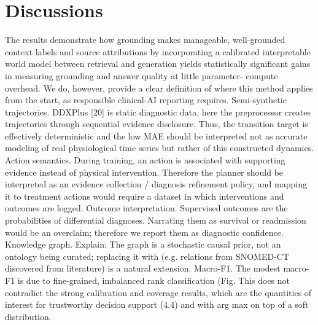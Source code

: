 \section{Discussions}
The results demonstrate how grounding makes manageable, well-grounded context labels and source attributions by incorporating a calibrated interpretable world model between retrieval and generation yields statistically significant gains in measuring grounding and answer quality at little parameter- compute overhead. We do, however, provide a clear definition of where this method applies from the start, as responsible clinical-AI reporting requires.
Semi-synthetic trajectories. DDXPlus [20] is static diagnostic data, here the preprocessor creates trajectories through sequential evidence disclosure. Thus, the transition target is effectively deterministic and the low MAE should be interpreted not as accurate modeling of real physiological time series but rather of this constructed dynamics.
Action semantics. During training, an action is associated with supporting evidence instead of physical intervention. Therefore the planner should be interpreted as an evidence collection / diagnosis refinement policy, and mapping it to treatment actions would require a dataset in which interventions and outcomes are logged.
Outcome interpretation. Supervised outcomes are the probabilities of differential diagnoses. Narrating them as survival or readmission would be an overclaim; therefore we report them as diagnostic confidence.
Knowledge graph. Explain: The graph is a stochastic causal prior, not an ontology being curated; replacing it with (e.g. relations from SNOMED-CT discovered from literature) is a natural extension.
Macro-F1. The modest macro-F1 is due to fine-grained, imbalanced rank classification (Fig. This does not contradict the strong calibration and coverage results, which are the quantities of interest for trustworthy decision support (4.4) and with arg max on top of a soft distribution.


